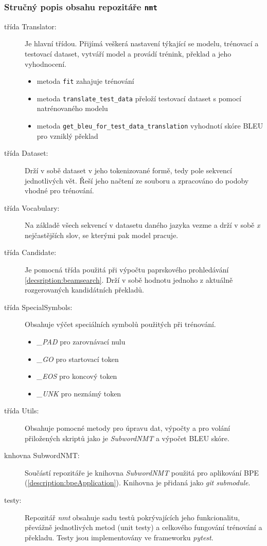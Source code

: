 \subsubsection{Stručný popis obsahu repozitáře \texttt{nmt}}
\begin{description}
  \item[třída Translator:] Je hlavní třídou. Přijímá veškerá nastavení týkající se modelu, trénovací a testovací dataset, vytváří model a provádí trénink, překlad a jeho vyhodnocení.
      \begin{itemize}
                  \item metoda \texttt{fit} zahajuje trénování
                  \item metoda \texttt{translate\_test\_data} přeloží testovací dataset s pomocí natrénovaného modelu
                  \item metoda \texttt{get\_bleu\_for\_test\_data\_translation} vyhodnotí skóre BLEU pro vzniklý překlad
      \end{itemize}
  \item[třída Dataset:] Drží v sobě dataset v jeho tokenizované formě, tedy pole sekvencí jednotlivých vět. Řeší jeho načtení ze souboru a zpracováno do podoby vhodné pro trénování.
  \item[třída Vocabulary:] Na základě všech sekvencí v datasetu daného jazyka vezme a drží v sobě \emph{x} nejčastějších slov, se kterými pak model pracuje.  
  \item[třída Candidate:] Je pomocná třída použitá při výpočtu paprskového prohledávání \ref{decsription:beamsearch}. Drží v sobě hodnotu jednoho z aktuálně rozgerovaných kandidátních překladů.
  \item[třída SpecialSymbols:] Obsahuje výčet speciálních symbolů použitých při trénování. \begin{itemize}
                  \item \emph{\_PAD} pro zarovnávací nulu
                  \item \emph{\_GO} pro startovací token
                  \item \emph{\_EOS} pro koncový token
                  \item \emph{\_UNK} pro neznámý token
                \end{itemize}
  \item[třída Utils:] Obsahuje pomocné metody pro úpravu dat, výpočty a pro volání přiložených skriptů jako je \emph{SubwordNMT} a výpočet BLEU skóre.
  \item[knhovna SubwordNMT:] Součástí repozitáře je knihovna \emph{SubwordNMT} použitá pro aplikování BPE (\ref{description:bpeApplication}). Knihovna je přidaná jako \emph{git submodule}.
  \item[testy:] Repozitář \emph{nmt} obsahuje sadu testů pokrývajících jeho funkcionalitu, převážně jednotlivých metod (unit testy) a celkového fungování trénování a překladu. Testy jsou implementovány ve frameworku \emph{pytest}.
\end{description}

